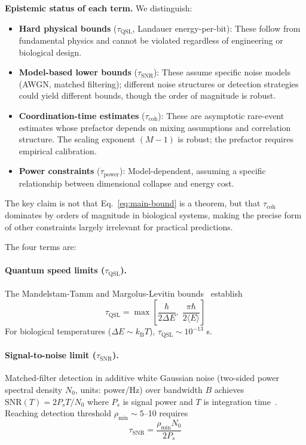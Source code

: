 \documentclass[12pt]{article}
\newcommand{\kB}{k_{\mathrm{B}}}
\begin{document}
\textbf{Epistemic status of each term.} We distinguish:
\begin{itemize}
\item \textbf{Hard physical bounds} ($\tau_{\mathrm{QSL}}$, Landauer energy-per-bit): These follow from fundamental physics and cannot be violated regardless of engineering or biological design.
\item \textbf{Model-based lower bounds} ($\tau_{\mathrm{SNR}}$): These assume specific noise models (AWGN, matched filtering); different noise structures or detection strategies could yield different bounds, though the order of magnitude is robust.
\item \textbf{Coordination-time estimates} ($\tau_{\mathrm{coh}}$): These are asymptotic rare-event estimates whose prefactor depends on mixing assumptions and correlation structure. The scaling exponent $(M-1)$ is robust; the prefactor requires empirical calibration.
\item \textbf{Power constraints} ($\tau_{\mathrm{power}}$): Model-dependent, assuming a specific relationship between dimensional collapse and energy cost.
\end{itemize}
The key claim is not that Eq.~\ref{eq:main-bound} is a theorem, but that $\tau_{\mathrm{coh}}$ dominates by orders of magnitude in biological systems, making the precise form of other constraints largely irrelevant for practical predictions.

The four terms are:

\paragraph{Quantum speed limits ($\tau_{\mathrm{QSL}}$).} The Mandelstam-Tamm and Margolus-Levitin bounds~\cite{mandelstam1945,margolus1998} establish
\[
\tau_{\mathrm{QSL}} = \max\left[\frac{\hbar}{2\Delta E},\; \frac{\pi\hbar}{2\langle E\rangle}\right]
\]
For biological temperatures ($\Delta E \sim \kB T$), $\tau_{\mathrm{QSL}} \sim 10^{-13}$ s.

\paragraph{Signal-to-noise limit ($\tau_{\mathrm{SNR}}$).} Matched-filter detection in additive white Gaussian noise (two-sided power spectral density $N_0$, units: power/Hz) over bandwidth $B$ achieves $\mathrm{SNR}(T) = 2P_s T/N_0$ where $P_s$ is signal power and $T$ is integration time~\cite{poor1994}. Reaching detection threshold $\rho_{\min} \sim 5$--10 requires
\[
\tau_{\mathrm{SNR}} = \frac{\rho_{\min} N_0}{2P_s}
\]
\end{document}
